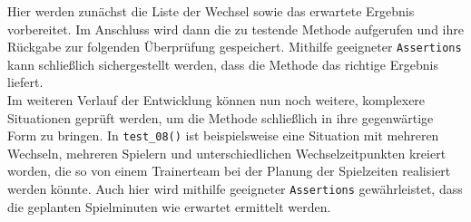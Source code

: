 Hier werden zunächst die Liste der Wechsel sowie das erwartete Ergebnis vorbereitet. 
Im Anschluss wird dann die zu testende Methode aufgerufen und ihre Rückgabe zur 
folgenden Überprüfung gespeichert. Mithilfe geeigneter \texttt{Assertions} kann 
schließlich sichergestellt werden, dass die Methode das richtige Ergebnis liefert. \\ 
Im weiteren Verlauf der Entwicklung können nun noch weitere, komplexere Situationen 
geprüft werden, um die Methode schließlich in ihre gegenwärtige Form zu bringen. In 
\texttt{test\_08()} ist beispielsweise eine Situation mit mehreren Wechseln, mehreren 
Spielern und unterschiedlichen Wechselzeitpunkten kreiert worden, die so von einem 
Trainerteam bei der Planung der Spielzeiten realisiert werden könnte. Auch hier wird 
mithilfe geeigneter \texttt{Assertions} gewährleistet, dass die geplanten Spielminuten 
wie erwartet ermittelt werden. 

